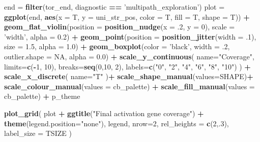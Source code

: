 \documentclass[]{book}
\newenvironment{Shaded}{\begin{snugshade}}{\end{snugshade}}
\newcommand{\DataTypeTok}[1]{\textcolor[rgb]{0.13,0.29,0.53}{#1}}
\newcommand{\DecValTok}[1]{\textcolor[rgb]{0.00,0.00,0.81}{#1}}
\newcommand{\FloatTok}[1]{\textcolor[rgb]{0.00,0.00,0.81}{#1}}
\newcommand{\KeywordTok}[1]{\textcolor[rgb]{0.13,0.29,0.53}{\textbf{#1}}}
\newcommand{\NormalTok}[1]{#1}
\newcommand{\OperatorTok}[1]{\textcolor[rgb]{0.81,0.36,0.00}{\textbf{#1}}}
\newcommand{\OtherTok}[1]{\textcolor[rgb]{0.56,0.35,0.01}{#1}}
\newcommand{\StringTok}[1]{\textcolor[rgb]{0.31,0.60,0.02}{#1}}
\begin{document}
\begin{Shaded}
\begin{Highlighting}[]
\NormalTok{end =}\StringTok{ }\KeywordTok{filter}\NormalTok{(tor_end, diagnostic }\OperatorTok{==}\StringTok{ 'multipath_exploration'}\NormalTok{)}
\NormalTok{plot =}\StringTok{ }\KeywordTok{ggplot}\NormalTok{(end, }\KeywordTok{aes}\NormalTok{(}\DataTypeTok{x =}\NormalTok{ T, }\DataTypeTok{y =}\NormalTok{ uni_str_pos, }\DataTypeTok{color =}\NormalTok{ T, }\DataTypeTok{fill =}\NormalTok{ T, }\DataTypeTok{shape =}\NormalTok{ T)) }\OperatorTok{+}
\StringTok{  }\KeywordTok{geom_flat_violin}\NormalTok{(}\DataTypeTok{position =} \KeywordTok{position_nudge}\NormalTok{(}\DataTypeTok{x =} \FloatTok{.2}\NormalTok{, }\DataTypeTok{y =} \DecValTok{0}\NormalTok{), }\DataTypeTok{scale =} \StringTok{'width'}\NormalTok{, }\DataTypeTok{alpha =} \FloatTok{0.2}\NormalTok{) }\OperatorTok{+}
\StringTok{  }\KeywordTok{geom_point}\NormalTok{(}\DataTypeTok{position =} \KeywordTok{position_jitter}\NormalTok{(}\DataTypeTok{width =} \FloatTok{.1}\NormalTok{), }\DataTypeTok{size =} \FloatTok{1.5}\NormalTok{, }\DataTypeTok{alpha =} \FloatTok{1.0}\NormalTok{) }\OperatorTok{+}
\StringTok{  }\KeywordTok{geom_boxplot}\NormalTok{(}\DataTypeTok{color =} \StringTok{'black'}\NormalTok{, }\DataTypeTok{width =} \FloatTok{.2}\NormalTok{, }\DataTypeTok{outlier.shape =} \OtherTok{NA}\NormalTok{, }\DataTypeTok{alpha =} \FloatTok{0.0}\NormalTok{) }\OperatorTok{+}
\StringTok{  }\KeywordTok{scale_y_continuous}\NormalTok{(}
    \DataTypeTok{name=}\StringTok{"Coverage"}\NormalTok{,}
    \DataTypeTok{limits=}\KeywordTok{c}\NormalTok{(}\OperatorTok{-}\DecValTok{1}\NormalTok{, }\DecValTok{10}\NormalTok{),}
    \DataTypeTok{breaks=}\KeywordTok{seq}\NormalTok{(}\DecValTok{0}\NormalTok{,}\DecValTok{10}\NormalTok{, }\DecValTok{2}\NormalTok{),}
    \DataTypeTok{labels=}\KeywordTok{c}\NormalTok{(}\StringTok{"0"}\NormalTok{, }\StringTok{"2"}\NormalTok{, }\StringTok{"4"}\NormalTok{, }\StringTok{"6"}\NormalTok{, }\StringTok{"8"}\NormalTok{, }\StringTok{"10"}\NormalTok{)}
\NormalTok{  ) }\OperatorTok{+}
\StringTok{  }\KeywordTok{scale_x_discrete}\NormalTok{(}
    \DataTypeTok{name=}\StringTok{"T"}
\NormalTok{  )}\OperatorTok{+}
\StringTok{  }\KeywordTok{scale_shape_manual}\NormalTok{(}\DataTypeTok{values=}\NormalTok{SHAPE)}\OperatorTok{+}
\StringTok{  }\KeywordTok{scale_colour_manual}\NormalTok{(}\DataTypeTok{values =}\NormalTok{ cb_palette) }\OperatorTok{+}
\StringTok{  }\KeywordTok{scale_fill_manual}\NormalTok{(}\DataTypeTok{values =}\NormalTok{ cb_palette) }\OperatorTok{+}
\StringTok{  }\NormalTok{p_theme}

\KeywordTok{plot_grid}\NormalTok{(}
\NormalTok{  plot }\OperatorTok{+}
\StringTok{    }\KeywordTok{ggtitle}\NormalTok{(}\StringTok{"Final activation gene coverage"}\NormalTok{) }\OperatorTok{+}
\StringTok{    }\KeywordTok{theme}\NormalTok{(}\DataTypeTok{legend.position=}\StringTok{"none"}\NormalTok{),}
\NormalTok{  legend,}
  \DataTypeTok{nrow=}\DecValTok{2}\NormalTok{,}
  \DataTypeTok{rel_heights =} \KeywordTok{c}\NormalTok{(}\DecValTok{2}\NormalTok{,.}\DecValTok{3}\NormalTok{),}
  \DataTypeTok{label_size =}\NormalTok{ TSIZE}
\NormalTok{)}
\end{Highlighting}
\end{Shaded}
\end{document}
